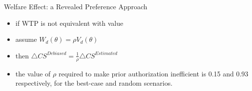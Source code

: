 \begin{frame}{Welfare Effect: a Revealed Preference Approach}
    \begin{itemize}
        \item if WTP is not equivalent with value
        \item assume $W_d(\theta)=\rho V_d(\theta)$
        \item then $\triangle CS^{Debiased}=\frac{1}{\rho}\triangle CS^{Estimated}$ 
        \item the value of $\rho$ required to make prior authorization inefficient is 0.15  and 0.93 respectively, for the best-case and random scenarios.
    \end{itemize}
    
\end{frame}